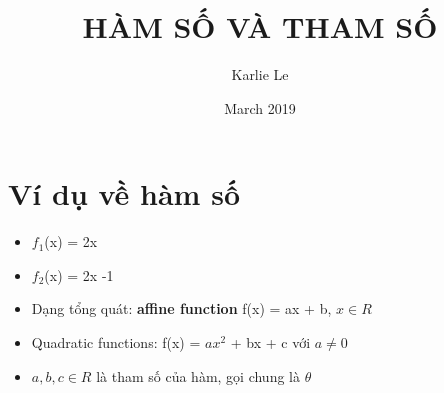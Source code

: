 \documentclass{article}
\title{HÀM SỐ VÀ THAM SỐ}
\author{Karlie Le }
\date{March 2019}
\begin{document}
\maketitle

\section{Ví dụ về hàm số}
\begin{itemize}
    \item $f_1$(x) = 2x
    \item $f_2$(x) = 2x -1
    \item Dạng tổng quát: \textbf{affine function} f(x) = ax + b, $x\in R$
    \item Quadratic functions: f(x) = $ax^2$ + bx + c với $a\neq 0$ 
    \item $a,b,c \in R$ là tham số của hàm, gọi chung là $\theta$
\end{itemize}
\end{document}
